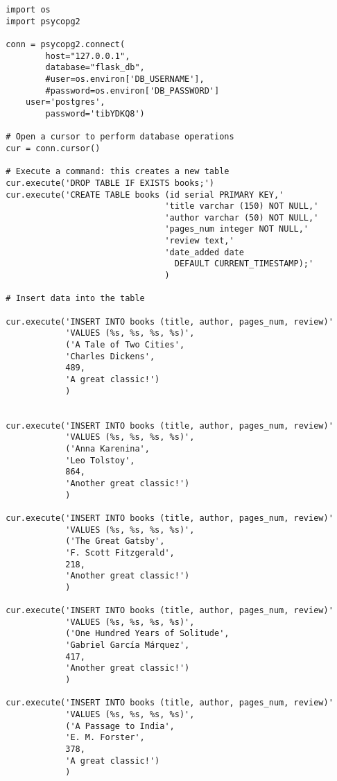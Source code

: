\documentclass[11pt]{report}
\begin{document}
\begin{verbatim}
  import os
  import psycopg2

  conn = psycopg2.connect(
          host="127.0.0.1",
          database="flask_db",
          #user=os.environ['DB_USERNAME'],
          #password=os.environ['DB_PASSWORD']
      user='postgres',
          password='tibYDKQ8')

  # Open a cursor to perform database operations
  cur = conn.cursor()

  # Execute a command: this creates a new table
  cur.execute('DROP TABLE IF EXISTS books;')
  cur.execute('CREATE TABLE books (id serial PRIMARY KEY,'
                                  'title varchar (150) NOT NULL,'
                                  'author varchar (50) NOT NULL,'
                                  'pages_num integer NOT NULL,'
                                  'review text,'
                                  'date_added date 
                                    DEFAULT CURRENT_TIMESTAMP);'
                                  )

  # Insert data into the table

  cur.execute('INSERT INTO books (title, author, pages_num, review)'
              'VALUES (%s, %s, %s, %s)',
              ('A Tale of Two Cities',
              'Charles Dickens',
              489,
              'A great classic!')
              )


  cur.execute('INSERT INTO books (title, author, pages_num, review)'
              'VALUES (%s, %s, %s, %s)',
              ('Anna Karenina',
              'Leo Tolstoy',
              864,
              'Another great classic!')
              )

  cur.execute('INSERT INTO books (title, author, pages_num, review)'
              'VALUES (%s, %s, %s, %s)',
              ('The Great Gatsby',
              'F. Scott Fitzgerald',
              218,
              'Another great classic!')
              )

  cur.execute('INSERT INTO books (title, author, pages_num, review)'
              'VALUES (%s, %s, %s, %s)',
              ('One Hundred Years of Solitude',
              'Gabriel García Márquez',
              417,
              'Another great classic!')
              )

  cur.execute('INSERT INTO books (title, author, pages_num, review)'
              'VALUES (%s, %s, %s, %s)',
              ('A Passage to India',
              'E. M. Forster',
              378,
              'A great classic!')
              )


\end{verbatim}
\end{document}
